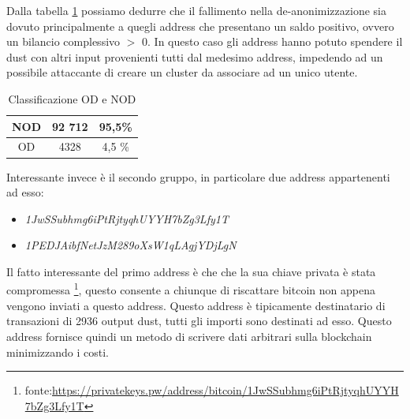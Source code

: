 Dalla tabella \ref{tab:OD_NOD_failed} possiamo dedurre che il fallimento nella de-anonimizzazione sia dovuto principalmente a quegli address che presentano un saldo positivo, ovvero un bilancio complessivo $>$ 0. In questo caso gli address hanno potuto spendere il dust con altri input provenienti tutti dal medesimo address, impedendo ad un possibile attaccante di creare un cluster da associare ad un unico utente.
\begin{table}[H]
    \centering
    \begin{tabular}{|c|c|c|}
        \hline
            NOD  & 92 712 & 95,5\%\\
        \hline 
            OD  & 4328 & 4,5 \%\\
        \hline
    \end{tabular}
    \caption{Classificazione OD e NOD}
    \label{tab:OD_NOD_failed}
\end{table}
Interessante invece è il secondo gruppo, in particolare due address appartenenti ad esso:
\begin{itemize}
    \item \textit{1JwSSubhmg6iPtRjtyqhUYYH7bZg3Lfy1T}
    \item \textit{1PEDJAibfNetJzM289oXsW1qLAgjYDjLgN}
\end{itemize}

Il fatto interessante del primo address è che che la sua chiave privata è stata compromessa \footnote{fonte:\url{https://privatekeys.pw/address/bitcoin/1JwSSubhmg6iPtRjtyqhUYYH7bZg3Lfy1T}}, questo consente a chiunque di riscattare bitcoin non appena vengono inviati a questo address. Questo address è tipicamente destinatario di transazioni di 2936 output dust, tutti gli importi sono destinati ad esso. Questo address fornisce quindi un metodo di scrivere dati arbitrari sulla blockchain minimizzando i costi.

